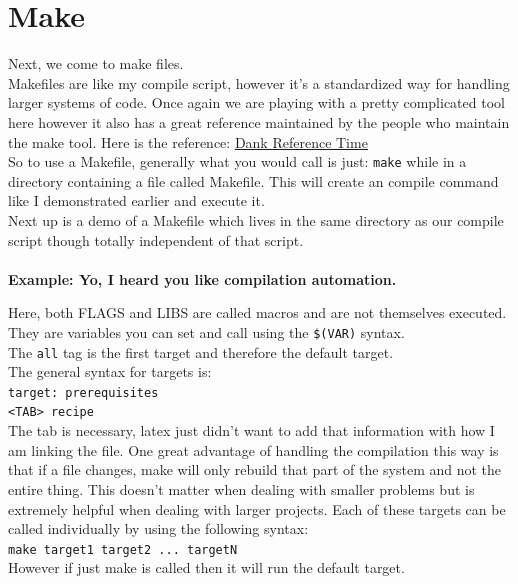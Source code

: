 \documentclass[12pt]{extarticle}
\theoremstyle{plain}
\theoremstyle{plain}
\theoremstyle{plain}
\theoremstyle{Definition}
\theoremstyle{Definition}
\theoremstyle{plain}
\theoremstyle{plain}
\begin{document}
	\section{Make}
		Next, we come to make files. \\
		Makefiles are like my compile script, however it's a standardized way for handling larger systems of code. Once again we are playing with a pretty complicated tool here however it also has a great reference maintained by the people who maintain the make tool. Here is the reference: \href{https://www.gnu.org/software/make/manual/make.html}{Dank Reference Time} \\
		So to use a Makefile, generally what you would call is just: \verb|make| while in a directory containing a file called Makefile. This will create an compile command like I demonstrated earlier and execute it. \\
		Next up is a demo of a Makefile which lives in the same directory as our compile script though totally independent of that script. \\ \\
		\textbf{Example: Yo, I heard you like compilation automation.} 
		
		Here, both FLAGS and LIBS are called macros and are not themselves executed. They are variables you can set and call using the \verb|$(VAR)| syntax. \\ 
		The \verb|all| tag is the first target and therefore the default target. \\ 
		The general syntax for targets is: \\ 
		\verb|target: prerequisites| \\
		\verb|<TAB> recipe| \\
		The tab is necessary, latex just didn't want to add that information with how I am linking the file. 
		One great advantage of handling the compilation this way is that if a file changes, make will only rebuild that part of the system and not the entire thing. This doesn't matter when dealing with smaller problems but is extremely helpful when dealing with larger projects. 
		Each of these targets can be called individually by using the following syntax: \\
		\verb|make target1 target2 ... targetN| \\
		However if just make is called then it will run the default target. 
\end{document}

